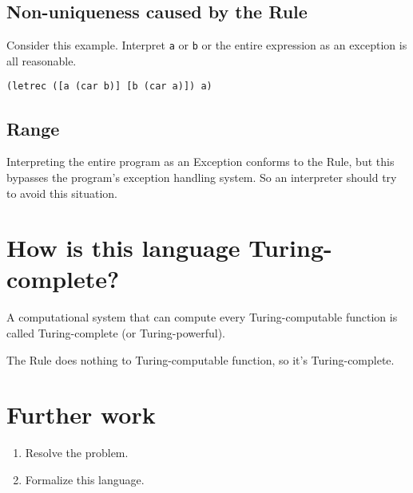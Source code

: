 \documentclass[10pt,preprint,numbers]{sigplanconf}
\begin{document}
\subsection{Non-uniqueness caused by the Rule}

Consider this example. Interpret {\scriptsize\verb|a|} or {\scriptsize\verb|b|} or the entire expression as an exception is all reasonable.
\lstset{language=Lisp}
\begin{lstlisting}[frame=single]
(letrec ([a (car b)] [b (car a)]) a)
\end{lstlisting}

\subsection{Range}

Interpreting the entire program as an Exception conforms to the Rule, but this bypasses the program's exception handling system. So an interpreter should try to avoid this situation.

\section{How is this language Turing-complete?}

A computational system that can compute every Turing-computable function is called Turing-complete (or Turing-powerful).~\citep{wikipedia_Turing_completeness}

The Rule does nothing to Turing-computable function, so it's Turing-complete.

\section{Further work}

\begin{enumerate}
\item Resolve the problem.
\item Formalize this language.
\end{enumerate}



\end{document}
